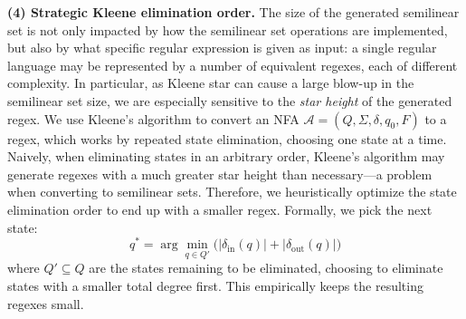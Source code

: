 \medskip
\noindent
\textbf{(4) Strategic Kleene elimination order.}  
The size of the generated semilinear set is not only impacted by how the
semilinear set operations are implemented, but also by what specific regular
expression is given as input: a single regular language may be represented by a
number of equivalent regexes, each of different complexity.
%
In particular, as Kleene star can cause a large blow-up in the semilinear set size,
we are especially sensitive to the \emph{star height} of the generated regex.
%
We use Kleene's algorithm to convert an NFA $\mathcal A=(Q,\Sigma,\delta,q_0,F)$ to a regex, which works by repeated state elimination, choosing one state at a time.
Naively, when eliminating states in an arbitrary order, Kleene's algorithm may generate regexes with a much greater star height than necessary---a problem
when converting to semilinear sets.
%
Therefore, we heuristically optimize the state elimination order to end up with a smaller regex. Formally, we pick the next state:
\[
q^* = 
	\arg\min_{q\in Q'}\bigl(|\delta_{\mathrm{in}}(q)|+|\delta_{\mathrm{out}}(q)|\bigr)
\]
where \(Q'\subseteq Q\) are the states remaining to be eliminated, choosing to
eliminate states with a smaller total degree first.
%
This empirically keeps the resulting regexes small.



